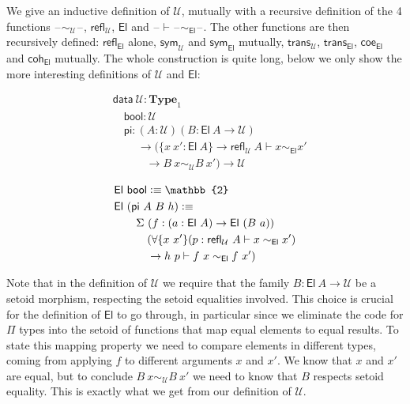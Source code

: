 \documentclass[autoref]{llncs}
\newcommand{\setoidU}{\mathcal{U}}
\newcommand{\mType}{\mathbf{Type}}
\newcommand{\El}{\textsf{El}}
\newcommand{\reflu}{\textsf{refl}_\setoidU}
\newcommand{\coeel}{\textsf{coe}_\El}
\newcommand{\cohel}{\textsf{coh}_\El}
\newcommand{\equ}[2]{#1 \sim_\setoidU #2}
\newcommand{\eqel}[3]{#1 \vdash #2 \sim_\El #3}
\providecommand\mathbbm{\mathbb}
\newcommand{\blank}{\mathord{\hspace{1pt}\text{--}\hspace{1pt}}}
\newcommand{\defeq}{\mathrel{\vcentcolon\equiv}}
\begin{document}
We give an inductive definition of $\setoidU$, mutually with a recursive definition
of the 4 functions
$\blank\sim_\setoidU\blank$, $\textsf{refl}_\setoidU$, $\El$ and $\blank\vdash\blank\sim_\El\blank$.
The other functions are then recursively defined: $\textsf{refl}_\El$ alone,
$\textsf{sym}_\setoidU$ and $\textsf{sym}_\El$ mutually,
$\textsf{trans}_\setoidU$, $\textsf{trans}_\El$, $\coeel$ and $\cohel$ mutually.
The whole construction is quite long, below we only show the more interesting
definitions of $\setoidU$ and $\El$: \\
{\small\vspace{0em}
\begin{minipage}{0.5\textwidth}
\begin{align*}
  & \textsf{data}\ \setoidU : \mType_1 \\
  & \quad \textsf{bool} : \setoidU \\
  & \quad \textsf{pi}
  :  (A : \setoidU) (B : \El\ A \to \setoidU)\\
  & \ \qquad \to (\{x\ x' : \El\ A\} \to \textsf{refl}_\setoidU\ A \vdash x \sim_\El x'\\
  & \qquad\quad \to B\ x \sim_\setoidU B\ x')
  \to \setoidU
\end{align*}
\end{minipage}
\begin{minipage}{0.5\textwidth}
\begin{align*}
  & \El\ \textsf{bool} \defeq \mathbbm{2} \\
  & \El\ (\textsf{pi}\ A\ B\ h) \defeq \\
  & \qquad \Sigma\ (f : (a : \El\ A) \to \El\ (B\ a)) \\
  & \qquad \quad
  (\forall\{x\ x'\}(p : \eqel{\reflu\ A}{x}{x'}) \\
  & \qquad \quad\to \eqel{h\ p}{f\ x}{f\ x'})
\end{align*}
\end{minipage}}\vspace{1em}

Note that in the definition of $\setoidU$ we require that the family $B : \El\ A
\to \setoidU$ be a setoid morphism, respecting the setoid equalities involved.
%
This choice is crucial for the definition of $\El$ to go through, in particular
since we eliminate the code for $\Pi$ types into the setoid of functions that
map equal elements to equal results. To state this mapping property we need to
compare elements in different types, coming from applying $f$ to different
arguments $x$ and $x'$. We know that $x$ and $x'$ are equal, but to conclude
$\equ{B\ x}{B\ x'}$ we need to know that $B$ respects setoid equality. This is
exactly what we get from our definition of $\setoidU$.
\end{document}
